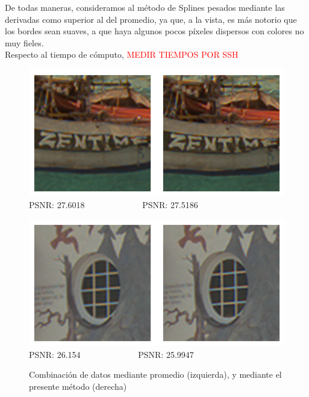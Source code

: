 \documentclass[a4paper]{article}
\begin{document}
De todas maneras, consideramos al método de Splines pesados mediante las derivadas como superior al del promedio, ya que, a la vista, es más notorio que los bordes sean suaves, a que haya algunos pocos píxeles dispersos con colores no muy fieles. \\

Respecto al tiempo de cómputo, \textcolor{red}{MEDIR TIEMPOS POR SSH\\}

\begin{figure}[h!]
	\begin{center}
	    \includegraphics[scale=0.47]{imagenes/Splines/RecortesSplines/pesos1y0/barco2.png}\\
	    PSNR: 27.6018 \ \ \ \ \ \ \ \ \ \ \ \ \ PSNR: 27.5186
	\end{center}
	\begin{center}
	    \includegraphics[scale=0.47]{imagenes/Splines/RecortesSplines/pesos1y0/ventana.png}\\
	    PSNR: 26.154 \ \ \ \ \ \ \ \ \ \ \ \ \ PSNR: 25.9947
	\end{center}
	\caption{Combinación de datos mediante promedio (izquierda), y mediante el presente método (derecha)}
	\label{splines3}
\end{figure}
\end{document}
